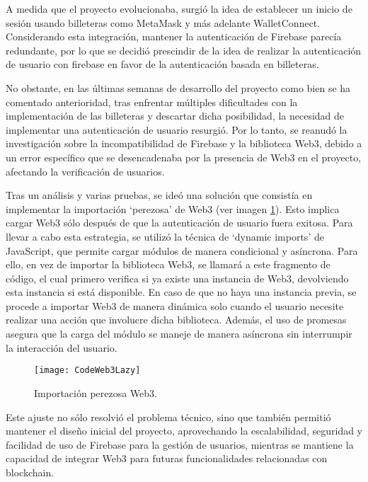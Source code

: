A medida que el proyecto evolucionaba, surgió la idea de establecer un inicio de sesión usando billeteras como MetaMask y más adelante WalletConnect. Considerando esta integración, mantener la autenticación de Firebase parecía redundante, por lo que se decidió prescindir de la idea de realizar la autenticación de usuario con firebase en favor de la autenticación basada en billeteras.
 
No obstante, en las últimas semanas de desarrollo del proyecto como bien se ha comentado anterioridad, tras enfrentar múltiples dificultades con la implementación de las billeteras y descartar dicha posibilidad, la necesidad de implementar una autenticación de usuario resurgió.
Por lo tanto, se reanudó la investigación sobre la incompatibilidad de Firebase y la biblioteca Web3, debido a un error específico que se desencadenaba por la presencia de Web3 en el proyecto, afectando la verificación de usuarios.

Tras un análisis y varias pruebas, se ideó una solución que consistía en implementar la importación `perezosa' de Web3 (ver imagen \ref{fig:CodeWeb3Lazy}). Esto implica cargar Web3 sólo después de que la autenticación de usuario fuera exitosa. Para llevar a cabo esta estrategia, se utilizó la técnica de `dynamic imports' de JavaScript, que permite cargar módulos de manera condicional y asíncrona. 
Para ello, en vez de importar la biblioteca Web3, se llamará a este fragmento de código, el cual primero verifica si ya existe una instancia de Web3, devolviendo esta instancia si está disponible. En caso de que no haya una instancia previa, se procede a importar Web3 de manera dinámica solo cuando el usuario necesite realizar una acción que involucre dicha biblioteca.
Además, el uso de promesas asegura que la carga del módulo se maneje de manera asíncrona  sin interrumpir la interacción del usuario.

\begin{figure}[h]
	\centering
	\texttt{[image: CodeWeb3Lazy]}
	\caption[Importación perezosa Web3]{Importación perezosa Web3.}
	\label{fig:CodeWeb3Lazy}
\end{figure}

Este ajuste no sólo resolvió el problema técnico, sino que también permitió mantener el diseño inicial del proyecto, aprovechando la escalabilidad, seguridad y facilidad de uso de Firebase para la gestión de usuarios, mientras se mantiene la capacidad de integrar Web3 para futuras funcionalidades relacionadas con blockchain.